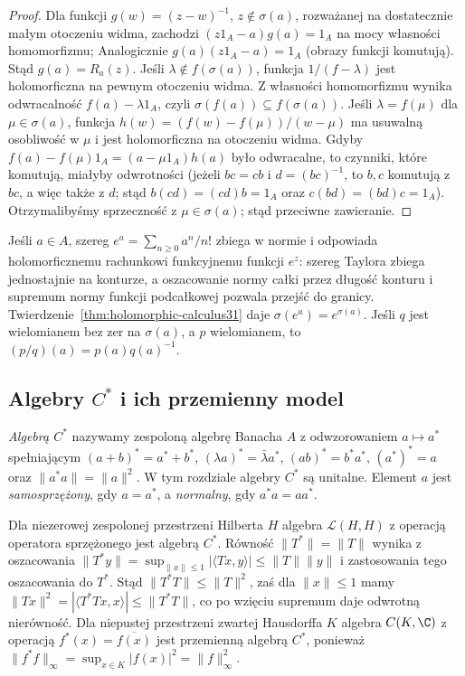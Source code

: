 \begin{proof}
Dla funkcji $g(w)=(z-w)^{-1}$, $z\notin\sigma(a)$,
rozważanej na dostatecznie małym otoczeniu widma, zachodzi $(z1_A-a)g(a)=1_A$ na mocy własności homomorfizmu;
Analogicznie $g(a)(z1_A-a)=1_A$ (obrazy funkcji
komutują). Stąd $g(a)=R_a(z)$.
Jeśli $\lambda\notin f(\sigma(a))$, funkcja
$1/(f-\lambda)$ jest holomorficzna na pewnym otoczeniu widma.
Z własności homomorfizmu wynika odwracalność
$f(a)-\lambda1_A$, czyli $\sigma(f(a))\subseteq f(\sigma(a))$.
Jeśli $\lambda=f(\mu)$ dla $\mu\in\sigma(a)$,
funkcja $h(w)=(f(w)-f(\mu))/(w-\mu)$ ma usuwalną
osobliwość w $\mu$ i jest holomorficzna na otoczeniu widma.
Gdyby $f(a)-f(\mu)1_A=(a-\mu1_A)h(a)$ było odwracalne,
to czynniki, które komutują, miałyby odwrotności
(jeżeli $bc=cb$ i $d=(bc)^{-1}$, to $b,c$ komutują
z $bc$, a więc także z $d$; stąd $b(cd)=(cd)b=1_A$
oraz $c(bd)=(bd)c=1_A$). Otrzymalibyśmy sprzeczność
z $\mu\in\sigma(a)$; stąd przeciwne zawieranie.
\end{proof}

\begin{przyklad}
Jeśli $a\in A$, szereg
$e^a=\sum_{n\ge0}a^n/n!$ zbiega w normie i odpowiada
holomorficznemu rachunkowi funkcyjnemu funkcji $e^z$:
szereg Taylora zbiega jednostajnie na konturze, a
oszacowanie normy całki przez długość konturu i supremum
normy funkcji podcałkowej pozwala przejść do granicy.
Twierdzenie~\ref{thm:holomorphic-calculus31} daje
$\sigma(e^a)=e^{\sigma(a)}$.
Jeśli $q$ jest wielomianem bez zer na $\sigma(a)$,
a $p$ wielomianem, to $(p/q)(a)=p(a)q(a)^{-1}$.
\end{przyklad}

\subsection{Algebry \texorpdfstring{$C^*$}{C*} i ich przemienny model}

\begin{definicja}[Algebra $C^*$]
\label{def:cstar31}
\emph{Algebrą $C^*$} nazywamy zespoloną algebrę Banacha $A$
z odwzorowaniem $a\mapsto a^*$ spełniającym
$(a+b)^*=a^*+b^*$, $(\lambda a)^*=\bar\lambda a^*$,
$(ab)^*=b^*a^*$, $(a^*)^*=a$ oraz
$\|a^*a\|=\|a\|^2$. W tym rozdziale algebry $C^*$
są unitalne. Element $a$ jest \emph{samosprzężony}, gdy $a=a^*$,
a \emph{normalny}, gdy $a^*a=aa^*$.
\end{definicja}

\begin{przyklad}
Dla niezerowej zespolonej przestrzeni Hilberta $H$
algebra $\mathcal L(H,H)$ z operacją operatora
sprzężonego jest algebrą $C^*$.
Równość $\|T^*\|=\|T\|$ wynika z oszacowania
$\|T^*y\|=\sup_{\|x\|\le1}|\langle Tx,y\rangle|
\le\|T\|\|y\|$ i zastosowania tego oszacowania do $T^*$.
Stąd $\|T^*T\|\le\|T\|^2$, zaś dla $\|x\|\le1$
mamy $\|Tx\|^2=|\langle T^*Tx,x\rangle|\le\|T^*T\|$,
co po wzięciu supremum daje odwrotną nierówność.
Dla niepustej przestrzeni zwartej Hausdorffa $K$
algebra $C(K,\C)$ z operacją $f^*(x)=\overline{f(x)}$
jest przemienną algebrą $C^*$, ponieważ
$\|f^*f\|_\infty=\sup_{x\in K}|f(x)|^2=\|f\|_\infty^2$.
\end{przyklad}

